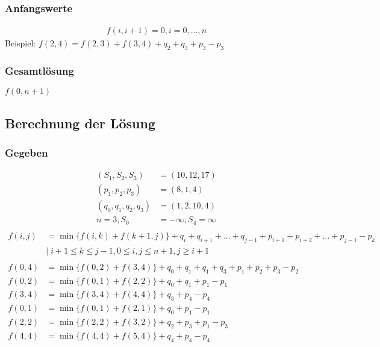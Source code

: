 \documentclass[ngerman,a4paper]{report}
\begin{document}
\subsubsection*{Anfangswerte}
\begin{align*}
f(i, i+1) = 0, i = 0,...,n
\end{align*}
Beispiel: $f(2,4) = f(2,3) + f(3,4) + q_2 + q_3 + p_3 -p_3$
\subsubsection*{Gesamtlösung}
$f(0,n+1)$ 

\subsection*{Berechnung der Lösung}
\subsubsection*{Gegeben}
\begin{align*}
(S_1,S_2,S_3) &= (10, 12, 17)\\
(p_1,p_2,p_3) &= (8, 1, 4)\\
(q_0,q_1,q_2,q_3) &= (1, 2, 10, 4)\\
n = 3, S_0 &= -\infty, S_4 = \infty\\
\end{align*}
\begin{align*}
f(i,j) &= \min \{ f(i,k) + f(k+1,j)\} + q_i + q_{i+1} + ... + q_{j-1} + p_{i+1} + p_{i+2} + ... + p_{j-1} - p_{k}\\
&|\; i+1\leq k \leq j-1, 0 \leq i, j \leq n+1, j \geq i+1\\
\\
f(0,4) &= \min \{ f(0,2) + f(3,4)\} + q_0 + q_{1} + q_{1} + q_{3} + p_{1} + p_{2} + p_{3} - p_{2}\\
f(0,2) &= \min \{ f(0,1) + f(2,2)\} + q_0 + q_{1} + p_{1} - p_{1}\\
f(3,4) &= \min \{ f(3,4) + f(4,4)\} + q_3 + p_{4} - p_{4}\\
f(0,1) &= \min \{ f(0,1) + f(2,1)\} + q_0 + p_{1} - p_{1}\\
f(2,2) &= \min \{ f(2,2) + f(3,2)\} + q_2 + p_{3} + p_{1} - p_{3}\\
f(4,4) &= \min \{ f(4,4) + f(5,4)\} + q_4 + p_{4} - p_{4}\\
\end{align*}
\end{document}

